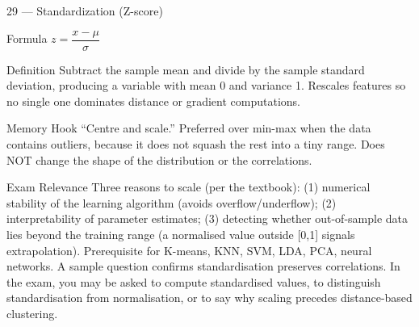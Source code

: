 \documentclass[aspectratio=169,8pt]{beamer}
\begin{document}
	\begin{frame}{29 --- Standardization (Z-score)}
		\begin{block}{Formula}
			$z = \dfrac{x - \mu}{\sigma}$
		\end{block}
		\begin{block}{Definition}
			Subtract the sample mean and divide by the sample standard deviation, producing a variable with mean 0 and variance 1. Rescales features so no single one dominates distance or gradient computations.
		\end{block}
		\begin{block}{Memory Hook}
			``Centre and scale.'' Preferred over min-max when the data contains outliers, because it does not squash the rest into a tiny range. Does NOT change the shape of the distribution or the correlations.
		\end{block}
		\begin{block}{Exam Relevance}
			Three reasons to scale (per the textbook): (1) numerical stability of the learning algorithm (avoids overflow/underflow); (2) interpretability of parameter estimates; (3) detecting whether out-of-sample data lies beyond the training range (a normalised value outside [0,1] signals extrapolation). Prerequisite for K-means, KNN, SVM, LDA, PCA, neural networks. A sample question confirms standardisation preserves correlations. In the exam, you may be asked to compute standardised values, to distinguish standardisation from normalisation, or to say why scaling precedes distance-based clustering.
		\end{block}
	\end{frame}
	
\end{document}
